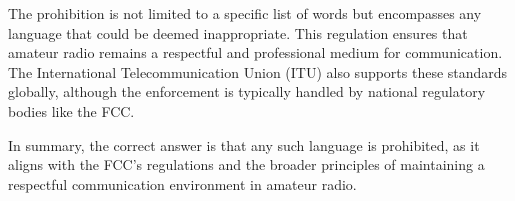 The prohibition is not limited to a specific list of words but encompasses any language that could be deemed inappropriate. This regulation ensures that amateur radio remains a respectful and professional medium for communication. The International Telecommunication Union (ITU) also supports these standards globally, although the enforcement is typically handled by national regulatory bodies like the FCC.

In summary, the correct answer is that any such language is prohibited, as it aligns with the FCC's regulations and the broader principles of maintaining a respectful communication environment in amateur radio.

